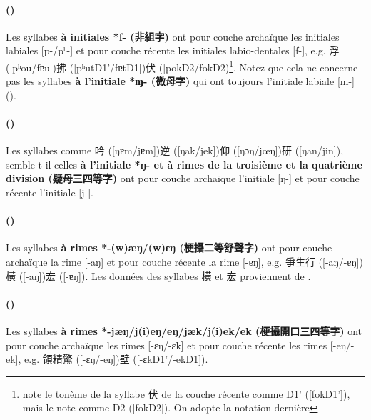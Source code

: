 \documentclass{scrbook}
\newcounter{c}[subsubsection]
\newcommand{\stpc}[1]{\stepcounter{#1}}
\newcommand{\termyyx}[1]{\textbf{#1}}
\begin{document}
\begin{sloppypar}
\stpc{c}\paragraph{()}
Les syllabes \termyyx{à initiales *f- (非組字)} ont pour couche archaïque les initiales labiales [p-/pʰ-] et pour couche récente les initiales labio-dentales [f-], e.g. 浮 ([pʰou/fɐu])拂 ([pʰutD1'/fɐtD1])伏 ([pokD2/fokD2)\footnote{\textcite[19]{Zhan2002yue} note le tonème de la syllabe 伏 de la couche récente comme D1' ([fokD1']), mais \textcite[499]{Bai1998Guangzhou} le note comme D2 ([fokD2]). On adopte la notation dernière}. Notez que cela ne concerne pas les syllabes \termyyx{à l'initiale *ɱ- (微母字)} qui ont toujours l'initiale labiale [m-] (\cite[31]{Zhan2002yue}). 

\stpc{c}\paragraph{()}
Les syllabes comme 吟 ([ŋɐm/jɐm])逆 ([ŋak/jek])仰 ([ŋɔŋ/jœŋ])研 ([ŋan/jin]), semble-t-il celles \termyyx{à l'initiale *ŋ- et à rimes de la troisième et la quatrième division (疑母三四等字)} ont pour couche archaïque l'initiale [ŋ-] et pour couche récente l'initiale [j-].  

\stpc{c}\paragraph{()}
Les syllabes \termyyx{à rimes *-(w)æŋ/(w)ɛŋ (梗攝二等舒聲字)} ont pour couche archaïque la rime [-aŋ] et pour couche récente la rime [-ɐŋ], e.g. 爭生行 ([-aŋ/-ɐŋ])橫 ([-aŋ])宏 ([-ɐŋ]). Les données des syllabes 橫 et 宏 proviennent de \textcite[16]{Bai1998Guangzhou}.

\stpc{c}\paragraph{()}
Les syllabes \termyyx{à rimes *-jæŋ/j(i)eŋ/eŋ/jæk/j(i)ek/ek (梗攝開口三四等字)} ont pour couche archaïque les rimes [-ɛŋ/-ɛk] et pour couche récente les rimes [-eŋ/-ek], e.g. 領精驚 ([-ɛŋ/-eŋ])壁 ([-ɛkD1'/-ekD1]). 


\end{sloppypar}
\end{document}
